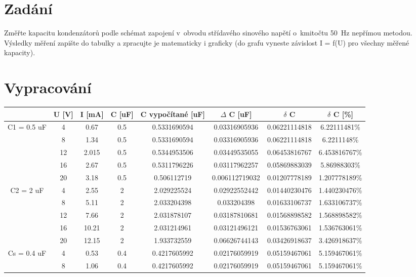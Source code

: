 \documentclass[a4paper]{article}
\begin{document}



\section*{Zadání}
Změřte kapacitu kondenzátorů podle schémat zapojení v obvodu střídavého sinového napětí o kmitočtu 50 Hz nepřímou metodou.
Výsledky měření zapište do tabulky a zpracujte je matematicky i graficky (do grafu vyneste závislost I = f(U) pro všechny měřené kapacity).
\section*{Vypracování}
\begin{longtable}{c|c|c|c|c|c|c|c}
   	& U [V] & I [mA] & C [uF] & C vypočítané [uF]        & $\Delta$ C [uF]        & $\delta$ C&$\delta$ C [\%]          \\ \endhead
    \hline
	C1 = 0.5 uF & 4 & 0.67  & 0.5 & 0.5331690594 & 0.03316905936 & 0.06221114818&6.22111481\%   \\
	& 8    & 1.34  & 0.5                 & 0.5331690594 & 0.03316905936  & 0.06221114818&6.2211148\%   \\
	& 12   & 2.015 & 0.5                 & 0.5344953506 & 0.03449535055  & 0.06453816767&6.453816767\%   \\
	& 16   & 2.67  & 0.5                 & 0.5311796226 & 0.03117962257  & 0.05869883039&5.86988303\%   \\
	& 20   & 3.18  & 0.5                 & 0.506112719  & 0.006112719032 & 0.01207778189&1.207778189\%   \\
	\hline
	C2 = 2 uF   & 4    & 2.55  & 2                   & 2.029225524  & 0.02922552442  & 0.01440230476&1.440230476\%   \\
	& 8    & 5.11  & 2                   & 2.033204398  & 0.033204398    & 0.01633106737&1.633106737\%   \\
	& 12   & 7.66  & 2                   & 2.031878107  & 0.03187810681  & 0.01568898582&1.568898582\%   \\
	& 16   & 10.21 & 2                   & 2.031214961  & 0.03121496121  & 0.01536763061&1.536763061\%   \\
	& 20   & 12.15 & 2                   & 1.933732559  & 0.06626744143  & 0.03426918637&3.426918637\%   \\
	\hline 
	Cs = 0.4 uF & 4    & 0.53  & 0.4                 & 0.4217605992 & 0.02176059919  & 0.05159467061&5.159467061\%   \\
	& 8    & 1.06  & 0.4                 & 0.4217605992 & 0.02176059919  & 0.05159467061&5.159467061\%   \\

\end{longtable}
\end{document}
